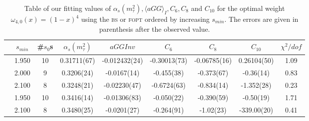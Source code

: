 \documentclass[../../index.tex]{subfiles}
\begin{document}
\begin{table}
  \centering
  \begin{adjustbox}{width=\textwidth}
    \begin{tabular}{ccccccccc}
      \toprule
      & \(s_{min}\) & \#\(s_0\)s & \(\alpha_s(m_\tau^2)\) & \(aGGInv\) & \(C_{6}\) & \(C_{8}\) & \(C_{10}\) & \(\chi^2/dof\)  \\
      \midrule
      \parbox[t]{2mm}{}
      & 1.950 & 10 & 0.31711(67) & -0.012432(24) & -0.30013(73) & -0.06785(16) & 0.26104(50) & 1.09 \\
      & 2.000 & 9 & 0.3206(24) & -0.0167(14) & -0.455(38) & -0.373(67) & -0.36(14) & 0.83 \\
      & 2.100 & 8 & 0.3248(21) & -0.02230(47) & -0.6724(63) & -0.834(14) & -1.352(28) & 0.23 \\
      \midrule
      \parbox[t]{2mm}{}
      & 1.950 & 10 & 0.3416(14) & -0.01306(83) & -0.050(22) & -0.390(59) & -0.50(19) & 1.71 \\
      & 2.100 & 8 & 0.3480(25) & -0.0201(27) & -0.264(91) & -1.02(23) & -339.00(20) & 0.41 \\
      \bottomrule
    \end{tabular}
  \end{adjustbox}
  \caption{Table of our fitting values of \(\alpha_s(m_\tau^2), \langle aGG
    \rangle_I, C_6, C_8\) and \(C_{10}\) for the optimal weight
    \(\omega_{4,0}(x)=(1-x)^4\) using the \textsc{bs} or \textsc{fopt} ordered by
    increasing \(s_{min}\). The errors are given in parenthesis after the
    observed value.}
  \label{table:fitOpt40AlD4D6D8D10}
\end{table}
\end{document}

